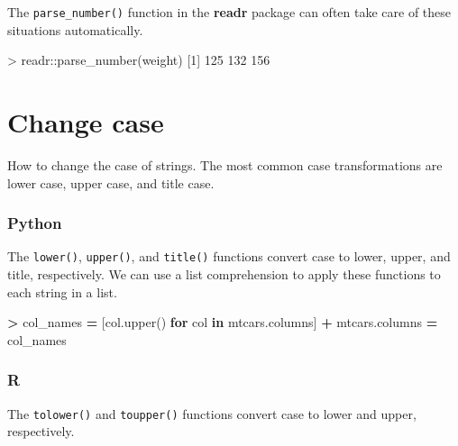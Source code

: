 \documentclass[
]{book}
\newenvironment{Shaded}{\begin{snugshade}}{\end{snugshade}}
\newcommand{\ControlFlowTok}[1]{\textcolor[rgb]{0.13,0.29,0.53}{\textbf{#1}}}
\newcommand{\DecValTok}[1]{\textcolor[rgb]{0.00,0.00,0.81}{#1}}
\newcommand{\FunctionTok}[1]{\textcolor[rgb]{0.00,0.00,0.00}{#1}}
\newcommand{\KeywordTok}[1]{\textcolor[rgb]{0.13,0.29,0.53}{\textbf{#1}}}
\newcommand{\NormalTok}[1]{#1}
\newcommand{\OperatorTok}[1]{\textcolor[rgb]{0.81,0.36,0.00}{\textbf{#1}}}
\newcommand{\SpecialCharTok}[1]{\textcolor[rgb]{0.00,0.00,0.00}{#1}}
\begin{document}
The \texttt{parse\_number()} function in the \textbf{readr} package can often take care of these situations automatically.

\begin{Shaded}
\begin{Highlighting}[]
\SpecialCharTok{\textgreater{}}\NormalTok{ readr}\SpecialCharTok{::}\FunctionTok{parse\_number}\NormalTok{(weight)}
\NormalTok{[}\DecValTok{1}\NormalTok{] }\DecValTok{125} \DecValTok{132} \DecValTok{156}
\end{Highlighting}
\end{Shaded}

\hypertarget{change-case}{%
\section{Change case}\label{change-case}}

How to change the case of strings. The most common case transformations are lower case, upper case, and title case.

\hypertarget{python-24}{%
\subsubsection*{Python}\label{python-24}}

The \texttt{lower()}, \texttt{upper()}, and \texttt{title()} functions convert case to lower, upper, and title, respectively. We can use a list comprehension to apply these functions to each string in a list.

\begin{Shaded}
\begin{Highlighting}[]
\OperatorTok{\textgreater{}}\NormalTok{ col\_names }\OperatorTok{=}\NormalTok{ [col.upper() }\ControlFlowTok{for}\NormalTok{ col }\KeywordTok{in}\NormalTok{ mtcars.columns]}
\OperatorTok{+}\NormalTok{ mtcars.columns }\OperatorTok{=}\NormalTok{ col\_names}
\end{Highlighting}
\end{Shaded}

\hypertarget{r-24}{%
\subsubsection*{R}\label{r-24}}

The \texttt{tolower()} and \texttt{toupper()} functions convert case to lower and upper, respectively.
\end{document}
